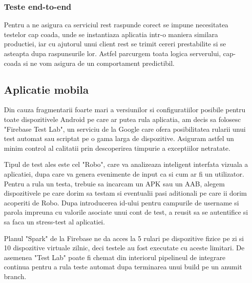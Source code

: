 \subsubsection {Teste end-to-end}

Pentru a ne asigura ca serviciul \acrshort{rest} raspunde corect se impune necesitatea testelor cap coada, unde se instantiaza aplicatia intr-o maniera similara productiei, iar cu ajutorul unui client rest se trimit cereri prestabilite si se asteapta dupa raspunsurile lor. Astfel parcurgem toata logica serverului, cap-coada si ne vom asigura de un comportament predictibil.

\subsection {Aplicatie mobila}

Din cauza fragmentarii foarte mari a versiunilor si configuratiilor posibile pentru toate dispozitivele Android pe care ar putea rula aplicatia, am decis sa folosesc "Firebase Test Lab", un serviciu de la Google care ofera posibilitatea rularii unui test automat sau scriptat pe o gama larga de dispozitive. 
Asiguram astfel un minim control al calitatii prin descoperirea timpurie a exceptiilor netratate.

Tipul de test ales este cel "Robo", care va analizeaza inteligent interfata vizuala a aplicatiei, dupa care va genera evenimente de input ca si cum ar fi un utilizator. Pentru a rula un testa, trebuie sa incarcam un APK sau un AAB, alegem dispozitivele pe care dorim sa testam si eventualii pasi aditionali pe care ii dorim acoperiti de Robo. Dupa introducerea id-ului pentru campurile de username si parola impreuna cu valorile asociate unui cont de test, a reusit sa se autentifice si sa faca un stress-test al aplicatiei.

Planul "Spark" de la Firebase ne da acces la 5 rulari pe dispozitive fizice pe zi si 10 dispozitive virtuale zilnic, deci testele au fost executate cu aceste limitari. De asemenea "Test Lab" poate fi chemat din interiorul pipelineul de integrare continua pentru a rula teste automat dupa terminarea unui build pe un anumit branch.